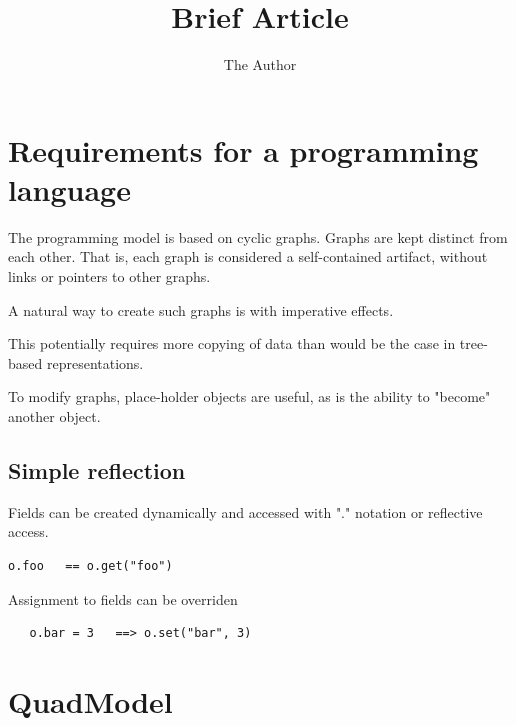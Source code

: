 \documentclass[11pt]{amsart}
\title{Brief Article}
\author{The Author}
\begin{document}
\maketitle

\section{Requirements for a programming language}

The programming model is based on cyclic graphs.
Graphs are kept distinct from each other. That is,
each graph is considered a self-contained
artifact, without links or pointers to other graphs.

A natural way to create such graphs is with 
imperative effects.

This potentially requires more copying of data
than would be the case in tree-based representations.

To modify graphs, place-holder objects are useful,
as is the ability to "become" another object.

\subsection{Simple reflection}

Fields can be created dynamically and accessed with
"." notation or reflective access.

\begin{verbatim}
o.foo   == o.get("foo")
\end{verbatim}

Assignment to fields can be overriden
\begin{verbatim}
   o.bar = 3   ==> o.set("bar", 3)
\end{verbatim}



\section{QuadModel}
\end{document}
